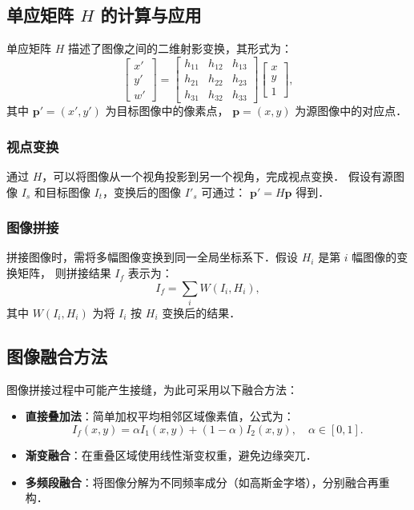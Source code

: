 \documentclass[12pt, a4paper, oneside]{ctexart}
\numberwithin{equation}{section}  %
\begin{document}
\subsection{单应矩阵 $H$ 的计算与应用}
单应矩阵 $H$ 描述了图像之间的二维射影变换，其形式为：
\[
\begin{bmatrix}
x' \\ y' \\ w'
\end{bmatrix}
=
\begin{bmatrix}
h_{11} & h_{12} & h_{13} \\
h_{21} & h_{22} & h_{23} \\
h_{31} & h_{32} & h_{33}
\end{bmatrix}
\begin{bmatrix}
x \\ y \\ 1
\end{bmatrix},
\]
其中 $\mathbf{p}' = (x', y')$ 为目标图像中的像素点，
$\mathbf{p} = (x, y)$ 为源图像中的对应点．

\subsubsection{视点变换}
通过 $H$，可以将图像从一个视角投影到另一个视角，完成视点变换．
假设有源图像 $I_s$ 和目标图像 $I_t$，变换后的图像 $I'_s$ 可通过：
$\mathbf{p}' = H \mathbf{p}$
得到．

\subsubsection{图像拼接}
拼接图像时，需将多幅图像变换到同一全局坐标系下．假设 $H_{i}$ 是第 $i$ 幅图像的变换矩阵，
则拼接结果 $I_f$ 表示为：
\[
I_f = \sum_{i} W(I_i, H_i),
\]
其中 $W(I_i, H_i)$ 为将 $I_i$ 按 $H_i$ 变换后的结果．

\subsection{图像融合方法}
图像拼接过程中可能产生接缝，为此可采用以下融合方法：
\begin{itemize}
    \item \textbf{直接叠加法}：简单加权平均相邻区域像素值，公式为：
    \[
    I_f(x, y) = \alpha I_1(x, y) + (1-\alpha) I_2(x, y), \quad \alpha \in [0, 1].
    \]
    \item \textbf{渐变融合}：在重叠区域使用线性渐变权重，避免边缘突兀．
    \item \textbf{多频段融合}：将图像分解为不同频率成分（如高斯金字塔），分别融合再重构．
\end{itemize}
\end{document}
